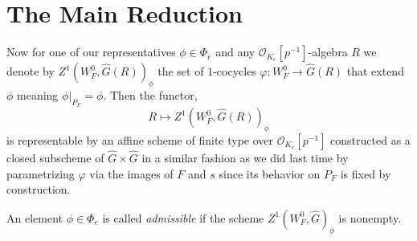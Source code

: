 \documentclass[12pt]{article}
\newcommand{\ok}{\mathcal{O}_{K_e}}
\begin{document}
\section{The Main Reduction}

Now for one of our representatives $\phi \in \Phi_e$ and any $\ok[p^{-1}]$-algebra $R$ we denote by $Z^1(W^0_F, \hat{G}(R))_\phi$ the set of $1$-cocycles $\varphi : W^0_F \to \hat{G}(R)$ that extend $\phi$ meaning $\phi |_{P_F} = \phi$. Then the functor,
\[ R \mapsto Z^1(W^0_F, \hat{G}(R))_\phi \]
is representable by an affine scheme of finite type over $\ok[p^{-1}]$ constructed as a closed subscheme of $\hat{G} \times \hat{G}$ in a similar fashion as we did last time by parametrizing $\varphi$ via the images of $F$ and $s$ since its behavior on $P_F$ is fixed by construction. 

\begin{defn}
An element $\phi \in \Phi_e$ is called \textit{admissible} if the scheme $Z^1(W_F^0, \hat{G})_\phi$ is nonempty.
\end{defn}
\end{document}
